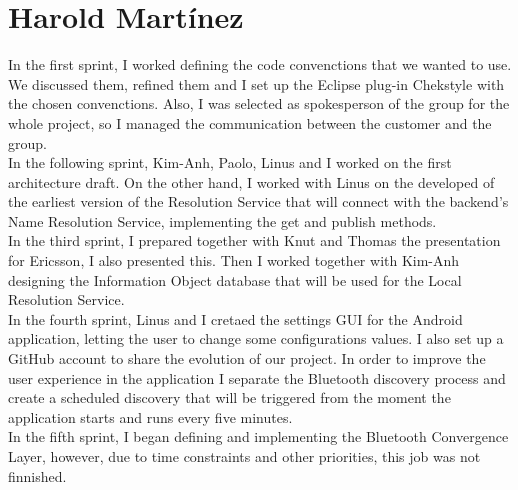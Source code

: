 \section{Harold Martínez}

In the first sprint, I worked defining the code convenctions that we wanted to use. 
We discussed them, refined them and I set up the Eclipse plug-in Chekstyle with the chosen convenctions.
Also, I was selected as spokesperson of the group for the whole project, so I managed the communication 
between the customer and the group.\\

In the following sprint, Kim-Anh, Paolo, Linus and I worked on the first architecture draft. On the other hand,
I worked with Linus on the developed of the earliest version of the Resolution Service that will connect with the 
backend's Name Resolution Service, implementing the get and publish methods.\\

In the third sprint, I prepared together with Knut and Thomas the presentation for Ericsson, I also presented this. 
Then I worked together with Kim-Anh designing the Information Object database that will be used for the 
Local Resolution Service.\\

In the fourth sprint, Linus and I cretaed the settings GUI for the Android application, letting the user to change 
some configurations values. I also set up a GitHub account to share the evolution of our project. In order to improve 
the user experience in the application I separate the Bluetooth discovery process and create a scheduled discovery that 
will be triggered from the moment the application starts and runs every five minutes.\\

In the fifth sprint, I began defining and implementing the Bluetooth Convergence Layer, however, due to time constraints 
and other priorities, this job was not finnished. 